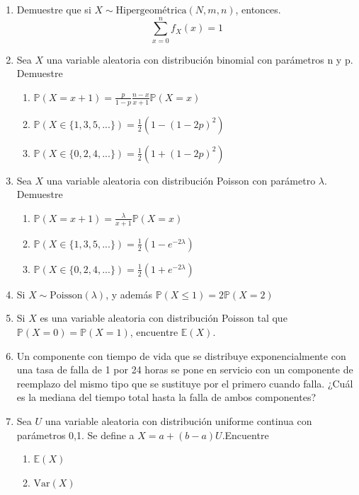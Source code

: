 \documentclass[11pt,a4paper]{report}
\begin{document}
\begin{enumerate}
		\item{
			Demuestre que si $X \sim \text{Hipergeométrica}(N,m,n)$, entonces.
				$$ \sum_{x = 0}^{n}f_X(x) = 1$$
		}

		\item{
			Sea $X$ una variable aleatoria con distribución binomial con
			parámetros n y p. Demuestre
			\begin{enumerate}
				\item {
					$\mathbb{P}(X = x + 1) = \frac{p}{1 - p} \frac{n - x}{x + 1}
					 \mathbb{P}(X = x)$
				}

				\item {
					$\mathbb{P}(X \in \{ 1,3,5,...\}) = \frac{1}{2}
					 (1 - (1 - 2p)^2)$
				}

				\item {
					$\mathbb{P}(X \in \{ 0,2,4,...\}) = \frac{1}{2}
					 (1 + (1 - 2p)^2)$
				}
			\end{enumerate}
		}

		\item{
		Sea $X$ una variable aleatoria con distribución Poisson con parámetro
		$\lambda$. Demuestre
			\begin{enumerate}
				\item {
					$\mathbb{P}(X = x + 1) = \frac{\lambda}{x + 1}
					 \mathbb{P}(X = x)$
				}

				\item {
					$\mathbb{P}(X \in \{ 1,3,5,...\}) = \frac{1}{2}
					 (1 - e^{-2\lambda})$
				}

				\item {
					$\mathbb{P}(X \in \{ 0,2,4,...\}) = \frac{1}{2}
					 (1 + e^{-2\lambda})$
				}
			\end{enumerate}
		}

		\item{
			Si $X \sim \text{Poisson}(\lambda)$, y además $\mathbb{P}(X \leq 1)
			= 2\mathbb{P}(X = 2)$
		}

		\item{
			Si $X$ es una variable aleatoria con distribución Poisson tal que
			$\mathbb{P}(X = 0) = \mathbb{P}(X = 1)$, encuentre $\mathbb{E}(X)$.
		}

		\item{
			Un componente con tiempo de vida que se distribuye exponencialmente
			con una tasa de falla de 1 por 24 horas se pone en servicio con un
			componente de reemplazo del mismo tipo que se sustituye por el
			primero cuando falla. ¿Cuál es la mediana del tiempo total hasta la
			falla de ambos componentes?
		}

		\item{
			Sea $U$ una variable aleatoria con distribución uniforme continua
			con parámetros 0,1. Se define a $X = a+(b - a)U$.Encuentre
			\begin{enumerate}
				\item {
					$\mathbb{E}(X)$
				}

				\item {
					$\text{Var}(X)$
				}
			\end{enumerate}

		}

	\end{enumerate}
\end{document}
